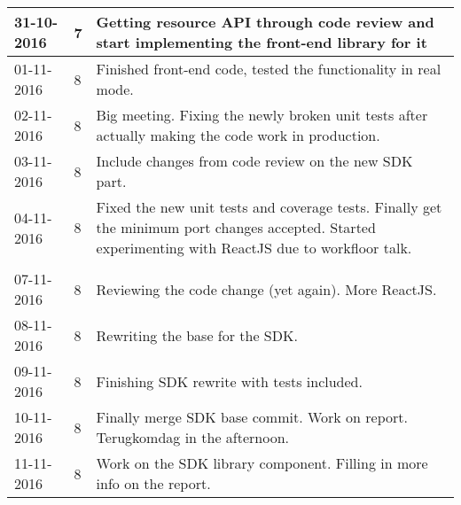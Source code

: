 \begin{tabular}{|p{2cm}|p{1cm}|p{10cm}|}
	\\ \hline
	
	31-10-2016 & 7 & Getting resource API through code review and start implementing the front-end library for it \\ \hline
	01-11-2016 & 8 & Finished front-end code, tested the functionality in real mode. \\ \hline
	02-11-2016 & 8 & Big meeting. Fixing the newly broken unit tests after actually making the code work in production. \\ \hline
	03-11-2016 & 8 & Include changes from code review on the new SDK part. \\ \hline
	04-11-2016 & 8 & Fixed the new unit tests and coverage tests. Finally get the minimum port changes accepted. Started experimenting with ReactJS due to workfloor talk. \\ \hline
	
	\\ \hline
	
	07-11-2016 & 8 & Reviewing the code change (yet again). More ReactJS. \\ \hline
	08-11-2016 & 8 & Rewriting the base for the SDK. \\ \hline
	09-11-2016 & 8 & Finishing SDK rewrite with tests included. \\ \hline
	10-11-2016 & 8 & Finally merge SDK base commit. Work on report. Terugkomdag in the afternoon. \\ \hline
	11-11-2016 & 8 & Work on the SDK library component. Filling in more info on the report. \\ \hline
\end{tabular}

